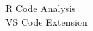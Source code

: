 \documentclass{article}
\begin{document}
\preview\sffamily
\hspace*{1cm}\scalebox{1.25}{\parbox{1.95cm}{\flowrlogo}}%
\parbox[c]{2.8cm}{\color{gray!44}\footnotesize R Code Analysis\\\scriptsize VS Code Extension}\hspace*{1cm}
\endpreview
\end{document}
